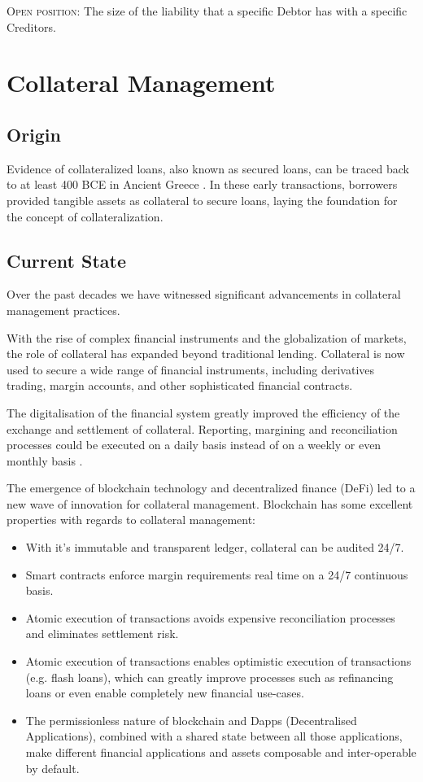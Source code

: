 \documentclass[sigconf,nonacm]{acmart}
\begin{document}
\textsc{Open position:} The size of the liability that a specific Debtor has with a specific Creditors.

\section{Collateral Management}
\label{sec:collateral-management}

\subsection{Origin}
Evidence of collateralized loans, also known as secured loans, can be traced back to at least 400 BCE in Ancient Greece \cite{millett2002lending}.
In these early transactions, borrowers provided tangible assets as collateral to secure loans, laying the foundation for the concept of collateralization.

\subsection{Current State}
Over the past decades we have witnessed significant advancements in collateral management practices.

With the rise of complex financial instruments and the globalization of markets, the role of collateral has expanded beyond traditional lending.
Collateral is now used to secure a wide range of financial instruments, including derivatives trading, margin accounts,
and other sophisticated financial contracts.

The digitalisation of the financial system greatly improved the efficiency of the exchange and settlement of collateral.
Reporting, margining and reconciliation processes could be executed on a daily basis instead of on a weekly or even monthly basis \cite{simmons2019collateral}.

The emergence of blockchain technology and decentralized finance (DeFi) led to a new wave of innovation for collateral management.
Blockchain has some excellent properties with regards to collateral management:
\begin{itemize}
    \item With it's immutable and transparent ledger, collateral can be audited 24/7.
    \item Smart contracts enforce margin requirements real time on a 24/7 continuous basis.
    \item Atomic execution of transactions avoids expensive reconciliation processes and eliminates settlement risk.
    \item Atomic execution of transactions enables optimistic execution of transactions (e.g. flash loans),
    which can greatly improve processes such as refinancing loans or even enable completely new financial use-cases.
    \item The permissionless nature of blockchain and Dapps (Decentralised Applications),
    combined with a shared state between all those applications,
    make different financial applications and assets composable and inter-operable by default.
\end{itemize}
\end{document}
